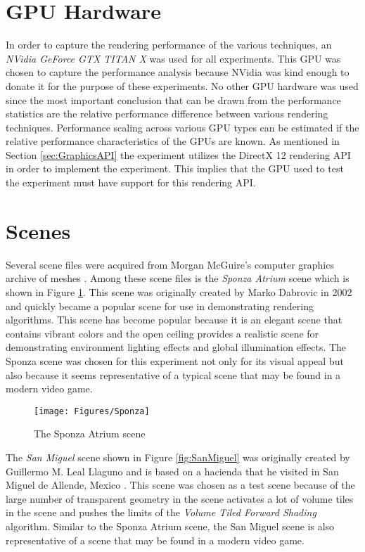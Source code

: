 \section{GPU Hardware}

In order to capture the rendering performance of the various techniques, an \emph{NVidia GeForce GTX TITAN X} was used for all experiments. This GPU was chosen to capture the performance analysis because NVidia was kind enough to donate it for the purpose of these experiments. No other GPU hardware was used since the most important conclusion that can be drawn from the performance statistics are the relative performance difference between various rendering techniques. Performance scaling across various GPU types can be estimated if the relative performance characteristics of the GPUs are known. As mentioned in Section \ref{sec:GraphicsAPI} the experiment utilizes the DirectX 12 rendering API in order to implement the experiment. This implies that the GPU used to test the experiment must have support for this rendering API.

\section{Scenes}
\label{sec:Scenes}

Several scene files were acquired from Morgan McGuire's computer graphics archive of meshes \parencite{McGuire2011Data}. Among these scene files is the \emph{Sponza Atrium} scene which is shown in Figure \ref{fig:Sponza}. This scene was originally created by Marko Dabrovic in 2002 \parencite{22_crytek_2017} and quickly became a popular scene for use in demonstrating rendering algorithms. This scene has become popular because it is an elegant scene that contains vibrant colors and the open ceiling provides a realistic scene for demonstrating environment lighting effects and global illumination effects. The Sponza scene was chosen for this experiment not only for its visual appeal but also because it seems representative of a typical scene that may be found in a modern video game.

\begin{figure}[H]
\centering
\texttt{[image: Figures/Sponza]}
\decoRule
\caption{The Sponza Atrium scene \parencite{22_crytek_2017}}
\label{fig:Sponza}
\end{figure}

The \emph{San Miguel} scene shown in Figure \ref{fig:SanMiguel} was originally created by Guillermo M. Leal Llaguno and is based on a hacienda that he visited in San Miguel de Allende, Mexico \parencite{McGuire2011Data}. This scene was chosen as a test scene because of the large number of transparent geometry in the scene activates a lot of volume tiles in the scene and pushes the limits of the \emph{Volume Tiled Forward Shading} algorithm. Similar to the Sponza Atrium scene, the San Miguel scene is also representative of a scene that may be found in a modern video game.

